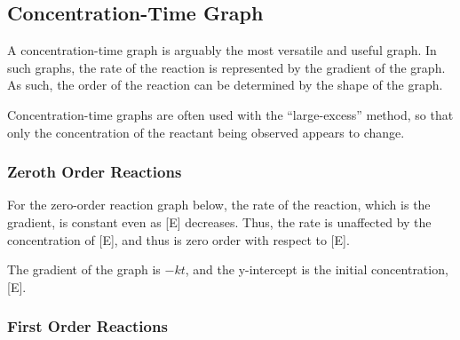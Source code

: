 		\subsection{Concentration-Time Graph}

			A concentration-time graph is arguably the most versatile and useful graph. In such graphs, the rate of the reaction is represented
			by the gradient of the graph. As such, the order of the reaction can be determined by the shape of the graph.

			Concentration-time graphs are often used with the ``large-excess'' method, so that only the concentration of the reactant being
			observed appears to change.


			\subsubsection{Zeroth Order Reactions}

				For the zero-order reaction graph below, the rate of the reaction, which is the gradient, is constant even as [E] decreases.
				Thus, the rate is unaffected by the concentration of [E], and thus is zero order with respect to [E].

				\begin{center}
				\end{center}

				The gradient of the graph is $-kt$, and the y-intercept is the initial concentration, [E].





			\pagebreak
			\subsubsection{First Order Reactions}

